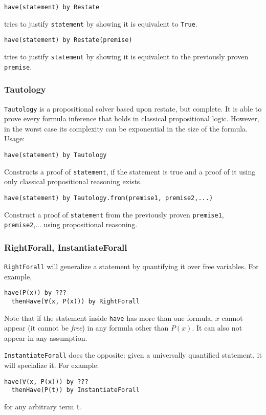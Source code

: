 \begin{lstlisting}[language=lisa]
  have(statement) by Restate
\end{lstlisting}
tries to justify \lstinline|statement| by showing it is equivalent to \lstinline|True|.

\begin{lstlisting}[language=lisa]
  have(statement) by Restate(premise)
\end{lstlisting}
tries to justify \lstinline|statement| by showing it is equivalent to the previously proven \lstinline|premise|.

\subsubsection*{Tautology}\label{tact:Tautology}
\lstinline|Tautology| is a propositional solver based upon restate, but complete. It is able to prove every formula inference that holds in classical propositional logic. However, in the worst case its complexity can be exponential in the size of the formula. Usage:

\begin{lstlisting}[language=lisa]
  have(statement) by Tautology
\end{lstlisting}
Constructs a proof of \lstinline|statement|, if the statement is true and a proof of it using only classical propositional reasoning exists.

\begin{lstlisting}[language=lisa]
  have(statement) by Tautology.from(premise1, premise2,...)
\end{lstlisting}
Construct a proof of \lstinline|statement| from the previously proven \lstinline|premise1|, \lstinline|premise2|,... using propositional reasoning.


\subsubsection*{RightForall, InstantiateForall}
\lstinline|RightForall| will generalize a statement by quantifying it over free variables. For example,
\begin{lstlisting}[language=lisa]
  have(P(x)) by ???
  thenHave(∀(x, P(x))) by RightForall 
\end{lstlisting}
Note that if the statement inside \lstinline|have| has more than one formula, $x$ cannot appear (it cannot be \emph{free}) in any formula other than $P(x)$. It can also not appear in any assumption.

\lstinline|InstantiateForall| does the opposite: given a universally quantified statement, it will specialize it. For example:
\begin{lstlisting}[language=lisa]
  have(∀(x, P(x))) by ???
  thenHave(P(t)) by InstantiateForall 
\end{lstlisting}
for any arbitrary term \lstinline|t|.

